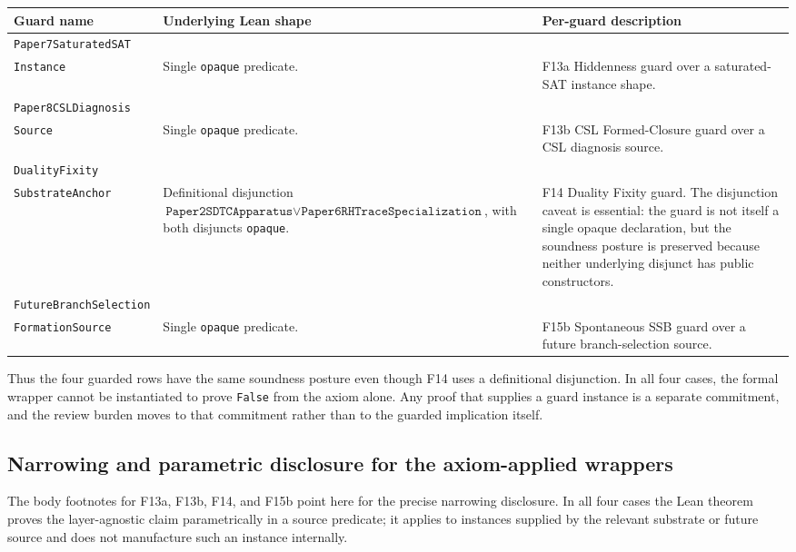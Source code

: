 \documentclass[11pt]{article}
\theoremstyle{definition}
\begin{document}
\begin{center}
\footnotesize
\begin{tabularx}{\textwidth}{@{}
    >{\raggedright\arraybackslash}p{}
    >{\raggedright\arraybackslash}p{}
    >{\raggedright\arraybackslash}X@{}}
  \toprule
  Guard name & Underlying Lean shape & Per-guard description \\
  \midrule
  \texttt{Paper7SaturatedSAT}\\\texttt{Instance} &
  Single \texttt{opaque} predicate. &
  F13a Hiddenness guard over a saturated-SAT instance shape. \\
  \texttt{Paper8CSLDiagnosis}\\\texttt{Source} &
  Single \texttt{opaque} predicate. &
  F13b CSL Formed-Closure guard over a CSL diagnosis source. \\
  \texttt{DualityFixity}\\\texttt{SubstrateAnchor} &
  Definitional disjunction
  \(\texttt{Paper2SDTCApparatus} \lor
    \texttt{Paper6RHTraceSpecialization}\), with both disjuncts
  \texttt{opaque}. &
  F14 Duality Fixity guard. The disjunction caveat is essential: the
  guard is not itself a single opaque declaration, but the soundness
  posture is preserved because neither underlying disjunct has public
  constructors. \\
  \texttt{FutureBranchSelection}\\\texttt{FormationSource} &
  Single \texttt{opaque} predicate. &
  F15b Spontaneous SSB guard over a future branch-selection source. \\
  \bottomrule
\end{tabularx}
\end{center}

Thus the four guarded rows have the same soundness posture even though
F14 uses a definitional disjunction. In all four cases, the formal
wrapper cannot be instantiated to prove \texttt{False} from the axiom
alone. Any proof that supplies a guard instance is a separate
commitment, and the review burden moves to that commitment rather than
to the guarded implication itself.

\subsection{Narrowing and parametric disclosure for the axiom-applied wrappers}
\label{subsec:narrowing-disclosure}

The body footnotes for F13a, F13b, F14, and F15b point here for the
precise narrowing disclosure. In all four cases the Lean theorem proves
the layer-agnostic claim parametrically in a source predicate; it applies
to instances supplied by the relevant substrate or future source and
does not manufacture such an instance internally.
\end{document}
